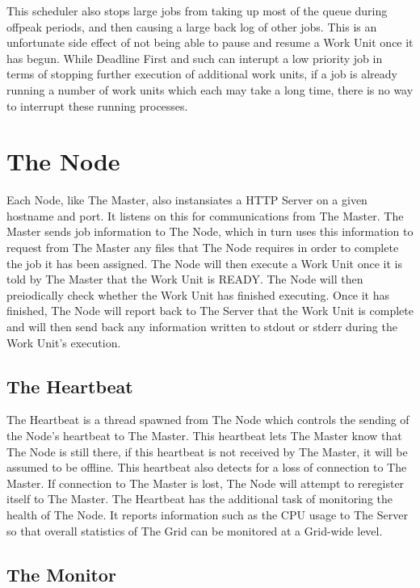 This scheduler also stops large jobs from taking up most of the queue during offpeak periods, and then causing a large back log of other jobs. This is an unfortunate side effect of not being able to pause and resume a Work Unit once it has begun. While Deadline First and such can interupt a low priority job in terms of stopping further execution of additional work units, if a job is already running a number of work units which each may take a long time, there is no way to interrupt these running processes.

\section{The Node}
\label{thenode}

Each Node, like The Master, also instansiates a HTTP Server on a given hostname and port. It listens on this for communications from The Master. The Master sends job information to The Node, which in turn uses this information to request from The Master any files that The Node requires in order to complete the job it has been assigned. The Node will then execute a Work Unit once it is told by The Master that the Work Unit is READY. The Node will then preiodically check whether the Work Unit has finished executing. Once it has finished, The Node will report back to The Server that the Work Unit is complete and will then send back any information written to stdout or stderr during the Work Unit's execution.

\subsection{The Heartbeat}
\label{theheartbeat}

The Heartbeat is a thread spawned from The Node which controls the sending of the Node's heartbeat to The Master. This heartbeat lets The Master know that The Node is still there, if this heartbeat is not received by The Master, it will be assumed to be offline. This heartbeat also detects for a loss of connection to The Master. If connection to The Master is lost, The Node will attempt to reregister itself to The Master. The Heartbeat has the additional task of monitoring the health of The Node. It reports information such as the CPU usage to The Server so that overall statistics of The Grid can be monitored at a Grid-wide level.

\subsection{The Monitor}
\label{themonitor}

